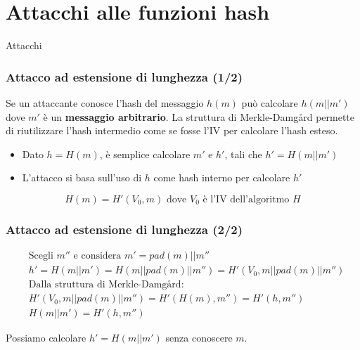 \section{Attacchi alle funzioni hash}


\begin{frame}[plain]
	\begin{center}
		{\Huge Attacchi}
	\end{center}
\end{frame}

\begin{frame}
	\frametitle{Attacco ad estensione di lunghezza (1/2)}
	Se un attaccante conosce l'hash del messaggio \( h(m) \) può calcolare \( h(m || m') \) dove \( m' \) è un \textbf{messaggio arbitrario}.
	La struttura di Merkle-Damgård permette di riutilizzare l'hash intermedio come se fosse l'IV per calcolare l'hash esteso.

	\vspace{0.5cm}
	\begin{itemize}
		\item Dato \(h = H(m)\), è semplice calcolare \(m'\) e \(h'\), tali che \(h' = H(m||m')\)
		\item L'attacco si basa sull'uso di \(h\) come hash interno per calcolare \(h'\)
	\end{itemize}

	\vspace{0.5cm}
	\[
		H(m) = H'(V_0, m) \text{ dove } V_0 \text{ è l'IV dell'algoritmo } H
	\]
\end{frame}

\begin{frame}
	\frametitle{Attacco ad estensione di lunghezza (2/2)}

	\begin{align*}
		 & \text{Scegli } m'' \text{ e considera } m' = pad(m)||m''    \\
		 & h' = H(m||m') = H(m||pad(m)||m'') = H'(V_0, m||pad(m)||m'') \\
		 & \text{Dalla struttura di Merkle-Damgård:}                   \\
		 & H'(V_0, m||pad(m)||m'') = H'(H(m), m'') = H'(h, m'')        \\
		 & H(m||m') = H'(h, m'')
	\end{align*}

	\vspace{0.5cm}
	Possiamo calcolare \(h' = H(m||m')\) senza conoscere \(m\).
\end{frame}


